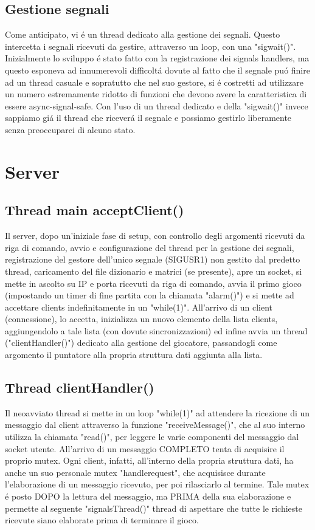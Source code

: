 \subsection{Gestione segnali}

Come anticipato, vi \'e un thread dedicato alla gestione dei segnali. Questo intercetta i segnali ricevuti da gestire, attraverso un loop, con una "sigwait()". Inizialmente lo sviluppo \'e stato fatto con la registrazione dei signals handlers, ma questo esponeva ad innumerevoli difficolt\'a dovute al fatto che il segnale pu\'o finire ad un thread casuale e sopratutto che nel suo gestore, si \'e costretti ad utilizzare un numero estremamente ridotto di funzioni che devono avere la caratteristica di essere async-signal-safe. Con l'uso di un thread dedicato e della "sigwait()" invece sappiamo gi\'a il thread che ricever\'a il segnale e possiamo gestirlo liberamente senza preoccuparci di alcuno stato.

\section{Server}

\subsection{Thread main acceptClient()}

Il server, dopo un'iniziale fase di setup, con controllo degli argomenti ricevuti da riga di comando, avvio e configurazione del thread per la gestione dei segnali, registrazione del gestore dell'unico segnale (SIGUSR1) non gestito dal predetto thread, caricamento del file dizionario e matrici (se presente), apre un socket, si mette in ascolto su IP e porta ricevuti da riga di comando, avvia il primo gioco (impostando un timer di fine partita con la chiamata "alarm()") e si mette ad accettare clients indefinitamente in un "while(1)". All'arrivo di un client (connessione), lo accetta, inizializza un nuovo elemento della lista clients, aggiungendolo a tale lista (con dovute sincronizzazioni) ed infine avvia un thread ("clientHandler()") dedicato alla gestione del giocatore, passandogli come argomento il puntatore alla propria struttura dati aggiunta alla lista.

 \subsection{Thread clientHandler()}

 Il neoavviato thread si mette in un loop "while(1)" ad attendere la ricezione di un messaggio dal client attraverso la funzione "receiveMessage()", che al suo interno utilizza la chiamata "read()", per leggere le varie componenti del messaggio dal socket utente. All'arrivo di un messaggio COMPLETO tenta di acquisire il proprio mutex. Ogni client, infatti, all'interno della propria struttura dati, ha anche un suo personale mutex "handlerequest", che acquisisce durante l'elaborazione di un messaggio ricevuto, per poi rilasciarlo al termine. Tale mutex \'e posto DOPO la lettura del messaggio, ma PRIMA della sua elaborazione e permette al seguente "signalsThread()" thread di aspettare che tutte le richieste ricevute siano elaborate prima di terminare il gioco.
 
